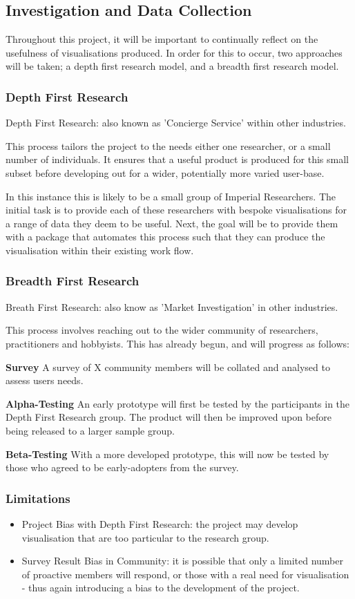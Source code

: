 \documentclass[a4paper,11pt,titlepage]{article}
\begin{document}
	\subsection{Investigation and Data Collection}
	Throughout this project, it will be important to continually reflect on the usefulness of visualisations produced. In order for this to occur, two approaches will be taken; a depth first research model, and a breadth first research model.
		\subsubsection{Depth First Research}
		Depth First Research: also known as 'Concierge Service' within other industries. 
		\par		
		This process tailors the project to the needs either one researcher, or a small number of individuals. It ensures that a useful product is produced for this small subset before developing out for a wider, potentially more varied user-base.
		\par
		In this instance this is likely to be a small group of Imperial Researchers. The initial task is to provide each of these researchers with bespoke visualisations for a range of data they deem to be useful. Next, the goal will be to provide them with a package that automates this process such that they can produce the visualisation within their existing work flow.
		\subsubsection{Breadth First Research}
		Breath First Research: also know as 'Market Investigation' in other industries.
		\par
		This process involves reaching out to the wider community of researchers, practitioners and hobbyists. This has already begun, and will progress as follows:
		\par 
		\textbf{Survey} A survey of X community members will be collated and analysed to assess users needs.
		\par 
		\textbf{Alpha-Testing} An early prototype will first be tested by the participants in the Depth First Research group. The product will then be improved upon before being released to a larger sample group.
		\par
		\textbf{Beta-Testing} With a more developed prototype, this will now be tested by those who agreed to be early-adopters from the survey.
		\par
		\subsubsection{Limitations}
		\begin{itemize}
			\item Project Bias with Depth First Research: the project may develop visualisation that are too particular to the research group.
			\item Survey Result Bias in Community: it is possible that only a limited number of proactive members will respond, or those with a real need for visualisation - thus again introducing a bias to the development of the project.
		\end{itemize}
\end{document}
